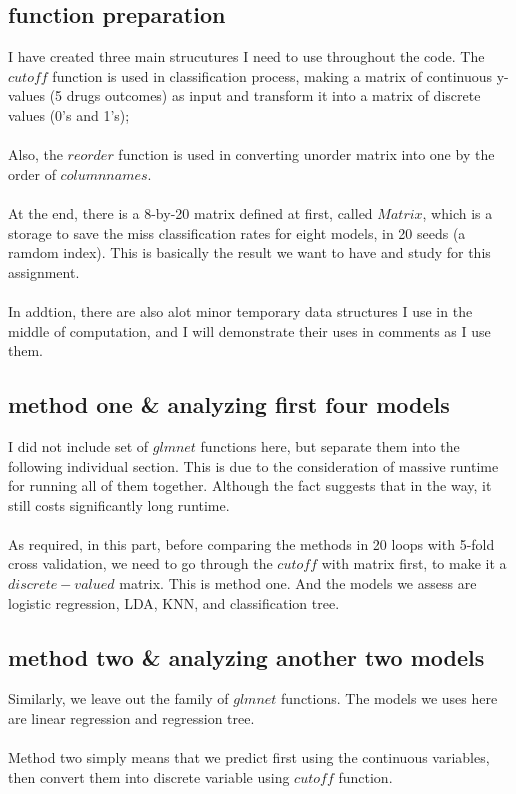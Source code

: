 \documentclass[12pt,letter]{article}
\begin{document}
\subsection{function preparation}
I have created three main strucutures I need to use throughout the code. The $cutoff$ function is used in classification process, making a matrix of continuous y-values (5 drugs outcomes) as input and transform it into a matrix of discrete values (0's and 1's);\\
\vspace{1mm}\\
Also, the $reorder$ function is used in converting unorder matrix into one by the order of $columnnames$.\\
\vspace{1mm}\\
At the end, there is a 8-by-20 matrix defined at first, called $Matrix$, which is a storage to save the miss classification rates for eight models, in 20 seeds (a ramdom index). This is basically the result we want to have and study for this assignment.\\
\vspace{1mm}\\
In addtion, there are also alot minor temporary data structures I use in the middle of computation, and I will demonstrate their uses in comments as I use them.

\subsection{method one \& analyzing first four models}
I did not include set of $glmnet$ functions here, but separate them into the following individual section. This is due to the consideration of massive runtime for running all of them together. Although the fact suggests that in the way, it still costs significantly long runtime.\\
\vspace{1mm}\\
As required, in this part, before comparing the methods in 20 loops with 5-fold cross validation, we need to go through the $cutoff$ with matrix first, to make it a $discrete-valued$ matrix. This is method one. And the models we assess are logistic regression, LDA, KNN, and classification tree.

\subsection{method two \& analyzing another two models}
Similarly, we leave out the family of $glmnet$ functions. The models we uses here are linear regression and regression tree.\\
\vspace{1mm}\\
Method two simply means that we predict first using the continuous variables, then convert them into discrete variable using $cutoff$ function.
\end{document}
